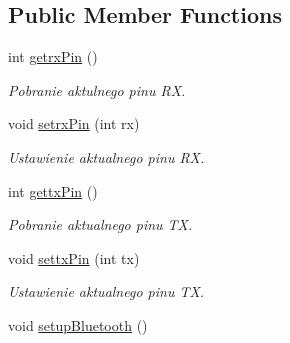 \subsection*{Public Member Functions}
\begin{DoxyCompactItemize}
\item 
int \hyperlink{class_bluetooth_a04d5a5f8b3c2773f274d712d0bd0dea3}{getrx\+Pin} ()
\begin{DoxyCompactList}\small\item\em Pobranie aktulnego pinu R\+X. \end{DoxyCompactList}\item 
void \hyperlink{class_bluetooth_a88dc0bc98a60c8324ec92d3907d861b5}{setrx\+Pin} (int rx)
\begin{DoxyCompactList}\small\item\em Ustawienie aktualnego pinu R\+X. \end{DoxyCompactList}\item 
int \hyperlink{class_bluetooth_a6d0fbc3a8743c7c5e0b34695cfe423bf}{gettx\+Pin} ()
\begin{DoxyCompactList}\small\item\em Pobranie aktualnego pinu T\+X. \end{DoxyCompactList}\item 
void \hyperlink{class_bluetooth_ac03e5ebe6e6044439710169b72c9c934}{settx\+Pin} (int tx)
\begin{DoxyCompactList}\small\item\em Ustawienie aktualnego pinu T\+X. \end{DoxyCompactList}\item 
\hypertarget{class_bluetooth_a1dfe29bb00c47c326fd25c5d793f52e8}{}void \hyperlink{class_bluetooth_a1dfe29bb00c47c326fd25c5d793f52e8}{setup\+Bluetooth} ()\label{class_bluetooth_a1dfe29bb00c47c326fd25c5d793f52e8}


\end{DoxyCompactItemize}
